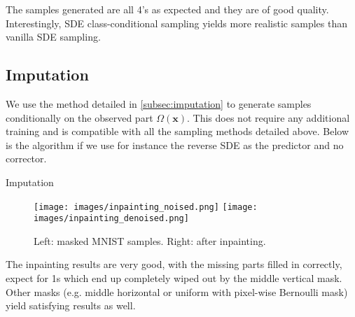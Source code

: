\documentclass{article}
\begin{document}
The samples generated are all 4's as expected and they are of good quality.
Interestingly, SDE class-conditional sampling yields more realistic samples than vanilla SDE sampling.

\subsection{Imputation}
We use the method detailed in \ref{subsec:imputation} to generate samples conditionally on the observed part $\Omega(\mathbf{x})$. This does not require any additional training and is compatible with all the sampling methods detailed above.
Below is the algorithm if we use for instance the reverse SDE as the predictor and no corrector.
\begin{algorithm}[H]
	\caption{Imputation}
	\label{alg:imputation}
	\begin{algorithmic}[1]
        \EndFor
        \item[]
        \item[]
	\end{algorithmic}
\end{algorithm}

\begin{figure}[H]
    \centering
    \texttt{[image: images/inpainting\_noised.png]}
    \texttt{[image: images/inpainting\_denoised.png]}
    \caption{Left: masked MNIST samples. Right: after inpainting.}
    \label{fig:inpainting}
\end{figure}

The inpainting results are very good, with the missing parts filled in correctly, expect for 1s which end up completely wiped out by the middle vertical mask.
Other masks (e.g. middle horizontal or uniform with pixel-wise Bernoulli mask) yield satisfying results as well.
\end{document}
